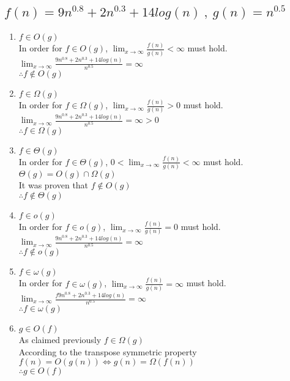 \documentclass[11pt]{article}
\begin{document}
	\subsection{$f(n)=9n^{0.8} + 2n^{0.3} + 14log(n) \ , \ g(n) = n^{0.5}$} 
		\begin{enumerate}
			\item $f \in O(g)$ \\
				In order for $f \in O(g)$, $\lim_{x \to \infty} \frac{f(n)}{g(n)} < \infty$	must hold. \\
				$\lim_{x \to \infty} \frac{9n^{0.8} + 2n^{0.3} + 14log(n)}{n^{0.5}} = \infty$ \\
				$\therefore f \notin O(g)$
				
			\item $f \in \Omega(g)$\\
				In order for $f \in \Omega(g)$, $\lim_{x \to \infty} \frac{f(n)}{g(n)} > 0$	must hold. \\
				$\lim_{x \to \infty} \frac{9n^{0.8} + 2n^{0.3} + 14log(n)}{n^{0.5}} = \infty > 0$ \\
				$\therefore f \in \Omega(g)$
				
			\item $f \in \Theta(g)$ \\
				In order for $f \in \Theta(g)$, $0 < \lim_{x \to \infty} \frac{f(n)}{g(n)} < \infty$	must hold. \\
				$\Theta(g) = O(g) \cap \Omega(g)$ \\
				It was proven that $f \notin O(g)$\\
				$\therefore f \notin \Theta(g)$
			
			\item $f \in o(g)$ \\
				In order for $f \in o(g)$, $\lim_{x \to \infty} \frac{f(n)}{g(n)} = 0$	must hold. \\
				$\lim_{x \to \infty} \frac{9n^{0.8} + 2n^{0.3} + 14log(n)}{n^{0.5}} = \infty $\\
				$\therefore f \notin o(g)$
			
			\item $f \in \omega(g)$ \\
				In order for $f \in \omega(g)$, $\lim_{x \to \infty} \frac{f(n)}{g(n)} = \infty$	must hold. \\
				$\lim_{x \to \infty} \frac{f9n^{0.8} + 2n^{0.3} + 14log(n)}{n^{0.5}} = \infty$ \\
				$\therefore f \in \omega(g)$
			
			
			\item $g \in O(f)$ \\
				As claimed previously $ f \in \Omega(g)$ \\ 
				According to the transpose symmetric property $f(n) = O(g(n)) \Leftrightarrow g(n) = \Omega (f(n)) $ \\
				$\therefore g \in O(f)$
				

\end{enumerate}
\end{document}
